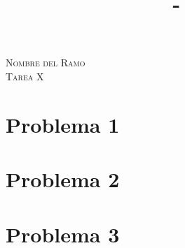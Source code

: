 \documentclass[letterpaper,12pt]{article}
\title{\Titulo\ -\ \Sigla\ \Ramo}
\author{\Nombre}
\newcommand{\Titulo}{Tarea X}
\newcommand{\Ramo}{Nombre del Ramo}
\begin{document}
\thispagestyle{empty}


\begin{center}
    \huge{\textsc{\Ramo\\ \Titulo}}
\end{center}

\vspace{1em}



\section*{Problema 1}
\vspace{0.8em}
    
\clearpage

\section*{Problema 2}
\vspace{0.8em}
    
\clearpage

\section*{Problema 3}
\vspace{0.8em}
    
\clearpage
\end{document}
